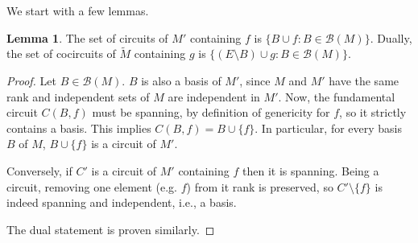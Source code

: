 \documentclass[12pt]{amsart}
\numberwithin{equation}{section}
\theoremstyle{definition}
\newtheorem{lemma}[theorem]{Lemma}
\newcommand{\Bcal}{{\mathcal B}}
\begin{document}
We start with a few lemmas.

\begin{lemma} \label{lem:generic_ex_circuit}
The set of circuits of $M'$ containing $f$ is $\{B\cup f:B\in\Bcal(M)\}$. Dually, the set of cocircuits of $\widetilde{M}$ containing $g$ is $\{(E\setminus B)\cup g:B\in\Bcal(M)\}$.
\end{lemma}

\begin{proof}
Let $B\in\Bcal(M)$. $B$ is also a basis of $M'$, since $M$ and $M'$ have the same rank and independent sets of $M$ are independent in $M'$. 
Now,
the fundamental circuit $C(B,f)$ must be spanning, by definition of genericity for $f$, so it strictly contains a basis. This implies $C(B,f) = B\cup \{f\}$. In particular, for every basis $B$ of $M$, $B\cup \{f\}$ is a circuit of $M'$.

Conversely, if $C'$ is a circuit of $M'$ containing $f$ then it is spanning. Being a circuit, removing one element (e.g. $f$) from it rank is preserved, so $C'\setminus \{f\}$ is indeed spanning and independent, i.e., a basis.
%

The dual statement is  proven similarly.
\end{proof}
\end{document}
